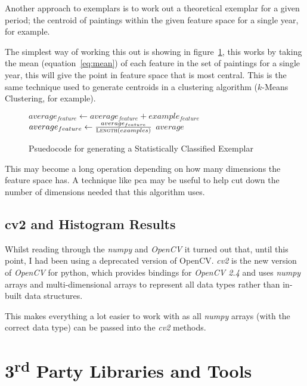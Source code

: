 Another approach to exemplars is to work out a theoretical exemplar for a given period; the 
centroid of paintings within the given feature space for a single year, for example.

The simplest way of working this out is showing in figure~\ref{fig:sce-psuedo}, this works by 
taking the mean (equation~\ref{eq:mean}) of each feature in the set of paintings for a single 
year, this will give the point in feature space that is most central. This is the same technique
used to generate centroids in a clustering algorithm ($k$-Means Clustering, for example).

\begin{figure}[h]
\begin{algorithmic}
\State $average_{feature} \gets average_{feature} + example_{feature}$
\EndFor
\EndFor
{}
\State$average_{feature} \gets \frac{average_{feature}}{\Call{Length}{examples}}$
\EndFor
\State \Return $average$
\EndFunction
\end{algorithmic}
\caption{Psuedocode for generating a Statistically Classified Exemplar}\label{fig:sce-psuedo}
\end{figure}

This may become a long operation depending on how many dimensions the feature space has. A
technique like \gls{pca} may be useful to help cut down the number of dimensions needed that this
algorithm uses.

\subsection{cv2 and Histogram Results}
Whilst reading through the \emph{numpy}\cite{EricJonesandTravisOliphantandPearuPetersonandothers2001SciPy} and \emph{OpenCV} it turned out that, until this point, I had 
been using a deprecated version of OpenCV. \emph{cv2} is the new version of \emph{OpenCV} for python, 
which provides bindings for \emph{OpenCV 2.4} and uses \emph{numpy} arrays and multi-dimensional arrays to 
represent all data types rather than in-built data structures.

This makes everything a lot easier to work with as all \emph{numpy} arrays (with the correct data type)
can be passed into the \emph{cv2} methods.


\section{3\textsuperscript{rd} Party Libraries and Tools}

